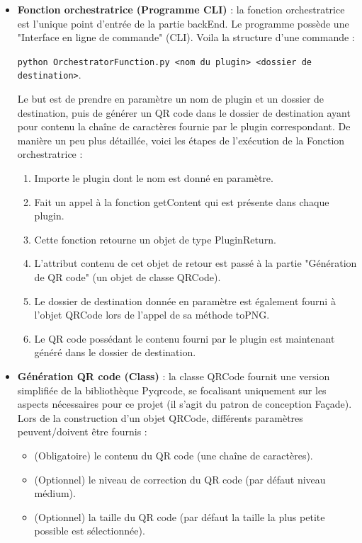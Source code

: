 \documentclass[a4paper,12pt]{article}
\begin{document}
\begin{itemize}
 \item 
     \textbf{Fonction orchestratrice (Programme CLI)} : la fonction orchestratrice est l'unique point d'entrée de la partie backEnd. Le programme possède une "Interface en ligne de commande" (CLI). Voila la structure d'une commande : 
     
     \verb|python OrchestratorFunction.py <nom du plugin> <dossier de destination>|. 
     
     Le but est de prendre en paramètre un nom de plugin et un dossier de destination, puis de générer un QR code dans le dossier de destination ayant pour contenu la chaîne de caractères fournie par le plugin correspondant.
\noindent De manière un peu plus détaillée, voici les étapes de l'exécution de la Fonction orchestratrice :
    \begin{enumerate}
        \item Importe le plugin dont le nom est donné en paramètre.
        \item Fait un appel à la fonction getContent qui est présente dans chaque plugin.
        \item Cette fonction retourne un objet de type PluginReturn.
        \item L'attribut contenu de cet objet de retour est passé à la partie "Génération de QR code" (un objet de classe QRCode).
        \item Le dossier de destination donnée en paramètre est également fourni à l'objet QRCode lors de l'appel de sa méthode toPNG.
        \item Le QR code possédant le contenu fourni par le plugin est maintenant généré dans le dossier de destination.
    \end{enumerate}
        
 \item 
    \textbf{Génération QR code (Class)} : la classe QRCode fournit une version simplifiée de la bibliothèque Pyqrcode, se focalisant uniquement sur les aspects nécessaires pour ce projet (il s'agit du patron de conception Façade). Lors de la construction d'un objet QRCode, différents paramètres peuvent/doivent être fournis : 
    \begin{itemize}
        \item (Obligatoire) le contenu du QR code (une chaîne de caractères).
        \item (Optionnel) le niveau de correction du QR code (par défaut niveau médium).
        \item (Optionnel) la taille du QR code (par défaut la taille la plus petite possible est sélectionnée).
    \end{itemize}
    

\end{itemize}
\end{document}
